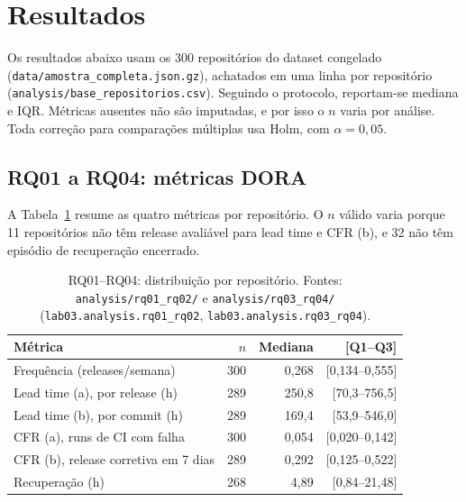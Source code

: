 \providecommand{\pendente}[1]{\textbf{[Pendente: #1]}}

\section{Resultados}

Os resultados abaixo usam os 300 repositórios do dataset congelado
(\texttt{data/amostra\_completa.json.gz}), achatados em uma linha por
repositório (\texttt{analysis/base\_repositorios.csv}). Seguindo o protocolo,
reportam-se mediana e IQR. Métricas ausentes não são imputadas, e por isso o
$n$ varia por análise. Toda correção para comparações múltiplas usa Holm, com
$\alpha = 0{,}05$.

\subsection{RQ01 a RQ04: métricas DORA}

A Tabela~\ref{tab:rq01-rq04} resume as quatro métricas por repositório. O $n$
válido varia porque 11 repositórios não têm release avaliável para lead time e
CFR (b), e 32 não têm episódio de recuperação encerrado.

\begin{table}[ht]
\centering
\caption{RQ01--RQ04: distribuição por repositório. Fontes:
\texttt{analysis/rq01\_rq02/} e \texttt{analysis/rq03\_rq04/}
(\texttt{lab03.analysis.rq01\_rq02}, \texttt{lab03.analysis.rq03\_rq04}).}
\label{tab:rq01-rq04}
\small
\begin{tabular}{lrrr}
\hline
Métrica & $n$ & Mediana & [Q1--Q3] \\
\hline
Frequência (releases/semana) & 300 & 0,268 & [0,134--0,555] \\
Lead time (a), por release (h) & 289 & 250,8 & [70,3--756,5] \\
Lead time (b), por commit (h) & 289 & 169,4 & [53,9--546,0] \\
CFR (a), runs de CI com falha & 300 & 0,054 & [0,020--0,142] \\
CFR (b), release corretiva em 7 dias & 289 & 0,292 & [0,125--0,522] \\
Recuperação (h) & 268 & 4,89 & [0,84--21,48] \\
\hline
\end{tabular}
\end{table}

